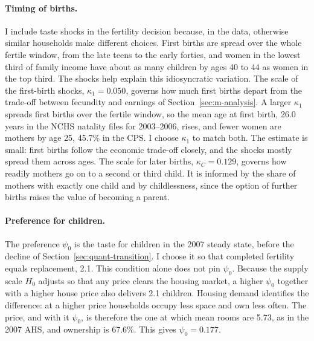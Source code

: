 \paragraph{Timing of births.}
I include taste shocks in the fertility decision because, in the data,
otherwise similar households make different choices. First births are spread
over the whole fertile window, from the late teens to the early forties, and
women in the lowest third of family income have about as many children by
ages 40 to 44 as women in the top third. The shocks help explain this
idiosyncratic variation. The scale of the first-birth shocks,
$\kappa_1=0.050$, governs how much first births depart from the trade-off
between fecundity and earnings of Section~\ref{sec:m-analysis}. A larger
$\kappa_1$ spreads first births over the fertile window, so the mean age at
first birth, 26.0 years in the NCHS natality files for 2003--2006, rises,
and fewer women are mothers by age 25, 45.7\% in the CPS. I choose
$\kappa_1$ to match both. The estimate is small: first births follow the
economic trade-off closely, and the shocks mostly spread them across ages.
The scale for later births, $\kappa_C=0.129$, governs how readily mothers go
on to a second or third child. It is informed by the share of mothers with
exactly one child and by childlessness, since the option of further births
raises the value of becoming a parent.

\paragraph{Preference for children.}
The preference $\psi_0$ is the taste for children in the 2007 steady state,
before the decline of Section~\ref{sec:quant-transition}. I choose it so that
completed fertility equals replacement, 2.1. This condition alone does not
pin $\psi_0$. Because the supply scale $H_0$ adjusts so that any price clears
the housing market, a higher $\psi_0$ together with a higher house price also
delivers 2.1 children. Housing demand identifies the difference: at a higher
price households occupy less space and own less often. The price, and with it
$\psi_0$, is therefore the one at which mean rooms are 5.73, as in the 2007
AHS, and ownership is 67.6\%. This gives $\psi_0=0.177$.

